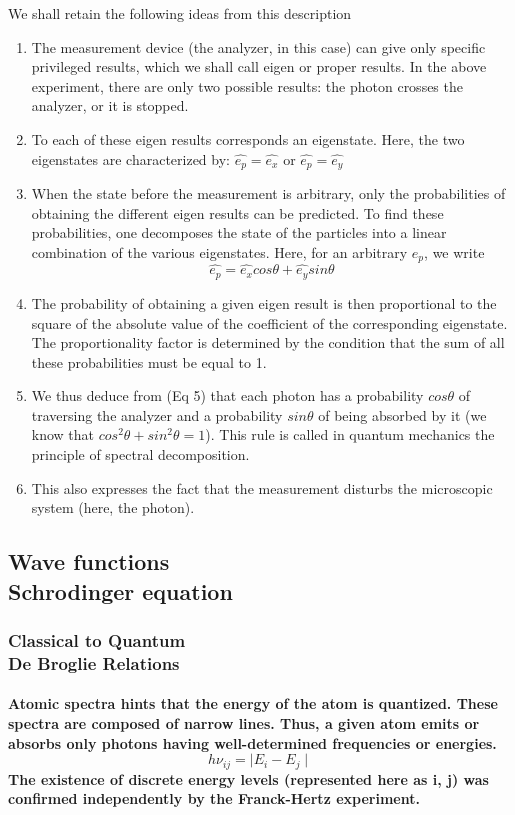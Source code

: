 \documentclass[%
 reprint,
 amsmath,amssymb,
 aps,
]{revtex4-2}
\begin{document}
We shall retain the following ideas from this description 
\begin{enumerate}
 \item The measurement device (the analyzer, in this case) can give only specific privileged results, which we shall call eigen or proper results. In the above experiment, there are only two possible results: the photon crosses the analyzer, or it is stopped.
 \item To each of these eigen results corresponds an eigenstate. Here, the two eigenstates are characterized by:
 $\hat{e_p}=\hat{e_x}$ or $\hat{e_p}=\hat{e_y}$
\item When the state before the measurement is arbitrary, only the probabilities of obtaining the different eigen results can be predicted. To find these probabilities, one decomposes the state of the particles into a linear combination of the various eigenstates. Here, for an arbitrary $e_p$, we write
\begin{equation}
     \hat{e_p}= \hat{e_x} cos\theta + \hat{e_y} sin\theta
\end{equation}
\item The probability of obtaining a given eigen result is then proportional to the square of the absolute value of the coefficient of the corresponding eigenstate. The proportionality factor is determined by the condition that the sum of all these probabilities must be equal to 1. 
\item We thus deduce from (Eq 5) that each photon has a probability $cos\theta$ of traversing the analyzer and a probability $sin\theta$ of being absorbed by it (we know that $cos^2\theta + sin^2\theta = 1$). This rule is called in quantum mechanics the principle of spectral decomposition.
\item This also expresses the fact that the measurement disturbs the microscopic system (here, the photon).
\end{enumerate}
\subsection{Wave functions \protect\\ Schrodinger equation}
\subsubsection{Classical to Quantum \protect\\ De Broglie Relations}
\paragraph{Atomic spectra hints that the energy of the atom is quantized. These spectra are composed of narrow lines. Thus, a given atom emits or absorbs only photons having well-determined frequencies or energies.
\begin{equation}
    h \nu_{ij} = \mid E_i-E_j\mid 
    \end{equation}
    The existence of discrete energy levels (represented here as i, j) was confirmed independently by the Franck-Hertz experiment.}
\end{document}
